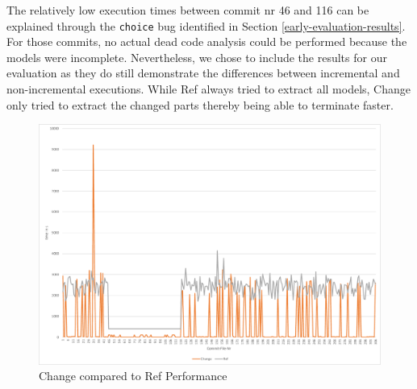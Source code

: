 \documentclass[a4paper]{article}
\begin{document}
The relatively low execution times between commit nr 46 and 116 can be explained through the \texttt{choice} bug identified in Section \ref{early-evaluation-results}. For those commits, no actual dead code analysis could be performed because the models were incomplete. Nevertheless, we chose to include the results for our evaluation as they do still demonstrate the differences between incremental and non-incremental executions. While Ref always tried to extract all models, Change only tried to extract the changed parts thereby being able to terminate faster. 


\begin{figure}[h] 
  \centering
  \begin{minipage}[b]{1\textwidth} 
    \caption[Change Performance]{Change compared to Ref Performance}\label{fig:change}
    \centering
    \includegraphics[height=1\textwidth, angle=90]{img/change-vs-ref.pdf}
  \end{minipage}
\end{figure}
\end{document}
